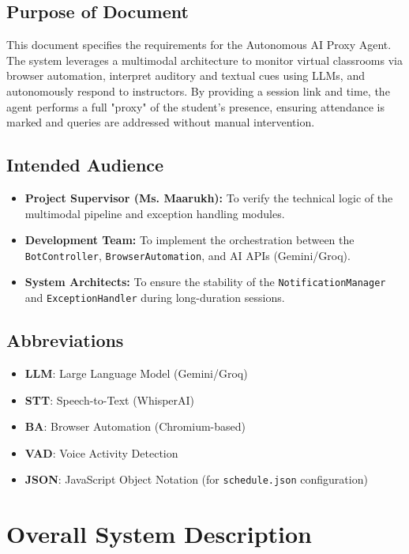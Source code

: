 \documentclass[12pt]{article}
\begin{document}
\subsection{Purpose of Document}
This document specifies the requirements for the Autonomous AI Proxy Agent. The system leverages a multimodal architecture to monitor virtual classrooms via browser automation, interpret auditory and textual cues using LLMs, and autonomously respond to instructors. By providing a session link and time, the agent performs a full "proxy" of the student's presence, ensuring attendance is marked and queries are addressed without manual intervention.

\subsection{Intended Audience}
\begin{itemize}
    \item \textbf{Project Supervisor (Ms. Maarukh):} To verify the technical logic of the multimodal pipeline and exception handling modules.
    \item \textbf{Development Team:} To implement the orchestration between the \texttt{BotController}, \texttt{BrowserAutomation}, and AI APIs (Gemini/Groq).
    \item \textbf{System Architects:} To ensure the stability of the \texttt{NotificationManager} and \texttt{ExceptionHandler} during long-duration sessions.
\end{itemize}

\subsection{Abbreviations}
\begin{itemize}
    \item \textbf{LLM}: Large Language Model (Gemini/Groq)
    \item \textbf{STT}: Speech-to-Text (WhisperAI)
    \item \textbf{BA}: Browser Automation (Chromium-based)
    \item \textbf{VAD}: Voice Activity Detection
    \item \textbf{JSON}: JavaScript Object Notation (for \texttt{schedule.json} configuration)
\end{itemize}

\section{Overall System Description}
\end{document}
